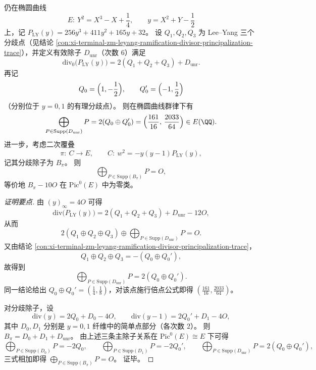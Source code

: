 \begin{conclusion}\label{con:xi-terminal-zm-leyang-unramified-sixpoint-abel-closed-form-branch-balance}
仍在椭圆曲线
\[
E:\ Y^2=X^3-X+\frac14,\qquad
y=X^2+Y-\frac12
\]
上，记 \(P_{\mathrm{LY}}(y)=256y^3+411y^2+165y+32\)。
设 \(Q_1,Q_2,Q_3\) 为 Lee--Yang 三个分歧点（见结论 \ref{con:xi-terminal-zm-leyang-ramification-divisor-principalization-trace}），并定义有效除子 \(D_{\mathrm{unr}}\)（次数 \(6\)）满足
\[
\mathrm{div}_0\!\bigl(P_{\mathrm{LY}}(y)\bigr)=2(Q_1+Q_2+Q_3)+D_{\mathrm{unr}}.
\]
再记
\[
Q_0=\Bigl(1,-\frac12\Bigr),\qquad
Q_0'=\Bigl(-1,\frac12\Bigr)
\]
（分别位于 \(y=0,1\) 的有理分歧点）。
则在椭圆曲线群律下有
\[
\bigoplus_{P\in\mathrm{Supp}(D_{\mathrm{unr}})}P
=2(Q_0\oplus Q_0')
=\Bigl(\frac{161}{16},\,\frac{2033}{64}\Bigr)\in E(\QQ).
\]
进一步，考虑二次覆叠
\[
\pi:\ C\to E,\qquad C:\ w^2=-y(y-1)P_{\mathrm{LY}}(y),
\]
记其分歧除子为 \(B_{\pi}\)。
则
\[
\bigoplus_{P\in\mathrm{Supp}(B_{\pi})}P=O,
\]
等价地 \(B_{\pi}-10O\) 在 \(\mathrm{Pic}^0(E)\) 中为零类。
\end{conclusion}
\begin{proof}[证明要点]
由 \((y)_\infty=4O\) 可得
\[
\mathrm{div}\!\bigl(P_{\mathrm{LY}}(y)\bigr)=2(Q_1+Q_2+Q_3)+D_{\mathrm{unr}}-12O,
\]
从而
\[
2(Q_1\oplus Q_2\oplus Q_3)\oplus\!\!\bigoplus_{P\in\mathrm{Supp}(D_{\mathrm{unr}})}\!\!P=O.
\]
又由结论 \ref{con:xi-terminal-zm-leyang-ramification-divisor-principalization-trace}，
\[
Q_1\oplus Q_2\oplus Q_3=-(Q_0\oplus Q_0'),
\]
故得到
\[
\bigoplus_{P\in\mathrm{Supp}(D_{\mathrm{unr}})}P=2(Q_0\oplus Q_0').
\]
同一结论给出 \(Q_0\oplus Q_0'=(\tfrac14,\tfrac18)\)，对该点施行倍点公式即得
\((\tfrac{161}{16},\tfrac{2033}{64})\)。
\par
对分歧除子，设
\[
\mathrm{div}(y)=2Q_0+D_0-4O,\qquad
\mathrm{div}(y-1)=2Q_0'+D_1-4O,
\]
其中 \(D_0,D_1\) 分别是 \(y=0,1\) 纤维中的简单点部分（各次数 \(2\)）。
则 \(B_{\pi}=D_0+D_1+D_{\mathrm{unr}}\)。
由上述三条主除子关系在 \(\mathrm{Pic}^0(E)\cong E\) 下可得
\[
\bigoplus_{P\in\mathrm{Supp}(D_0)}P=-2Q_0,\qquad
\bigoplus_{P\in\mathrm{Supp}(D_1)}P=-2Q_0',\qquad
\bigoplus_{P\in\mathrm{Supp}(D_{\mathrm{unr}})}P=2(Q_0\oplus Q_0'),
\]
三式相加即得
\(
\bigoplus_{P\in\mathrm{Supp}(B_{\pi})}P=O
\)。
证毕。
\end{proof}

